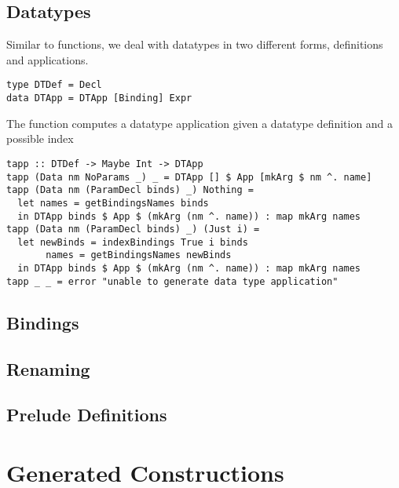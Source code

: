 \subsection{Datatypes}
Similar to functions, we deal with datatypes in two different forms, definitions and applications. 
\begin{verbatim}
type DTDef = Decl
data DTApp = DTApp [Binding] Expr 
\end{verbatim}
The function  computes a datatype application given a datatype definition and a possible index 
\begin{verbatim}
tapp :: DTDef -> Maybe Int -> DTApp 
tapp (Data nm NoParams _) _ = DTApp [] $ App [mkArg $ nm ^. name]
tapp (Data nm (ParamDecl binds) _) Nothing =
  let names = getBindingsNames binds 
  in DTApp binds $ App $ (mkArg (nm ^. name)) : map mkArg names  
tapp (Data nm (ParamDecl binds) _) (Just i) =
  let newBinds = indexBindings True i binds
       names = getBindingsNames newBinds 
  in DTApp binds $ App $ (mkArg (nm ^. name)) : map mkArg names  
tapp _ _ = error "unable to generate data type application" 
\end{verbatim}

\subsection{Bindings}

\subsection{Renaming}

\subsection{Prelude Definitions}



\section{Generated Constructions}
\label{sec:generatedConstructions}

